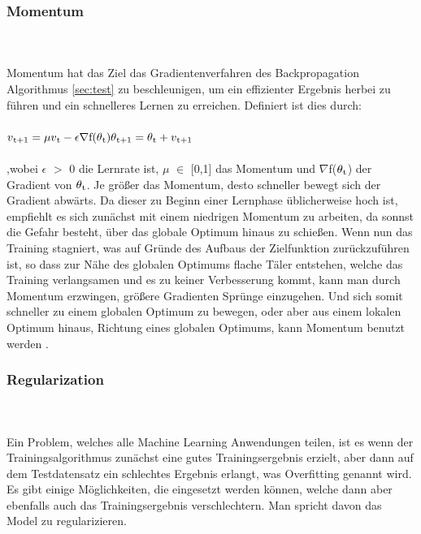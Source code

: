 \documentclass{llncs}
\begin{document}
\subsubsection{Momentum}\label{sec:momentum}
~\\\\
Momentum hat das Ziel das Gradientenverfahren des Backpropagation Algorithmus \ref{sec:test} zu beschleunigen, um ein effizienter Ergebnis herbei zu führen und ein schnelleres Lernen zu erreichen. Definiert ist dies durch:
\\\\
\begin{math}
v\textsubscript{t+1} =\mu v\textsubscript{t}-\epsilon\nabla$f$(\theta\textsubscript{t})\\\\
\theta\textsubscript{t+1}= \theta\textsubscript{t}+v\textsubscript{t+1}
\end{math}
\\\\
,wobei $\epsilon$ $>$ 0 die Lernrate ist,  $\mu$ $\in$ [0,1] das Momentum und $\nabla$f($\theta\textsubscript{t}$) der Gradient von $\theta\textsubscript{t}$. Je größer das Momentum, desto schneller bewegt sich der Gradient abwärts. Da dieser zu Beginn einer Lernphase üblicherweise hoch ist, empfiehlt es sich zunächst mit einem niedrigen Momentum zu arbeiten, da sonnst die Gefahr besteht, über das globale Optimum hinaus zu schießen. Wenn nun das Training stagniert, was auf Gründe des Aufbaus der Zielfunktion zurückzuführen ist, so dass zur Nähe des globalen Optimums flache Täler entstehen, welche das Training verlangsamen und es zu keiner Verbesserung kommt, kann man durch Momentum erzwingen, größere Gradienten Sprünge einzugehen. Und sich somit schneller zu einem globalen Optimum zu bewegen, oder aber aus einem lokalen Optimum hinaus, Richtung eines globalen Optimums, kann Momentum benutzt werden \cite{momentum}.

\subsubsection{Regularization}
~\\\\
Ein Problem, welches alle Machine Learning Anwendungen teilen, ist es wenn der Trainingsalgorithmus zunächst eine gutes Trainingsergebnis erzielt, aber dann auf dem Testdatensatz ein schlechtes Ergebnis erlangt, was Overfitting genannt wird. Es gibt einige Möglichkeiten, die eingesetzt werden können, welche dann aber ebenfalls auch das Trainingsergebnis verschlechtern. Man spricht davon das Model zu regularizieren.
\end{document}
